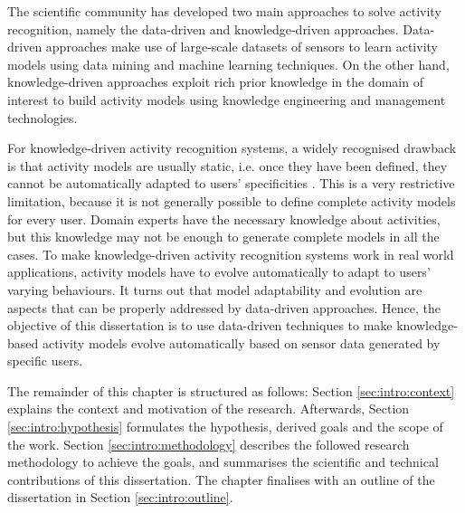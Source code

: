 
The scientific community has developed two main approaches to solve activity recognition, namely the data-driven and knowledge-driven approaches. Data-driven approaches make use of large-scale datasets of sensors to learn activity models using data mining and machine learning techniques. On the other hand, knowledge-driven approaches exploit rich prior knowledge in the domain of interest to build activity models using knowledge engineering and management technologies.


For knowledge-driven activity recognition systems, a widely recognised drawback is that activity models are usually static, i.e. once they have been defined, they cannot be automatically adapted to users' specificities \citep{Chen2014}. This is a very restrictive limitation, because it is not generally possible to define complete activity models for every user. Domain experts have the necessary knowledge about activities, but this knowledge may not be enough to generate complete models in all the cases. To make knowledge-driven activity recognition systems work in real world applications, activity models have to evolve automatically to adapt to users' varying behaviours. It turns out that model adaptability and evolution are aspects that can be properly addressed by data-driven approaches. Hence, the objective of this dissertation is to use data-driven techniques to make knowledge-based activity models evolve automatically based on sensor data generated by specific users.


The remainder of this chapter is structured as follows: Section \ref{sec:intro:context} explains the context and motivation of the research. Afterwards, Section \ref{sec:intro:hypothesis} formulates the hypothesis, derived goals and the scope of the work. Section \ref{sec:intro:methodology} describes the followed research methodology to achieve the goals, and  summarises the scientific and technical contributions of this dissertation. The chapter finalises with an outline of the dissertation in Section \ref{sec:intro:outline}.



